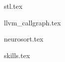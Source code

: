 \documentclass[11pt]{article}
\begin{document}



{stl.tex}


{llvm_callgraph.tex}

{neurosort.tex}



{skills.tex}
\end{document}
